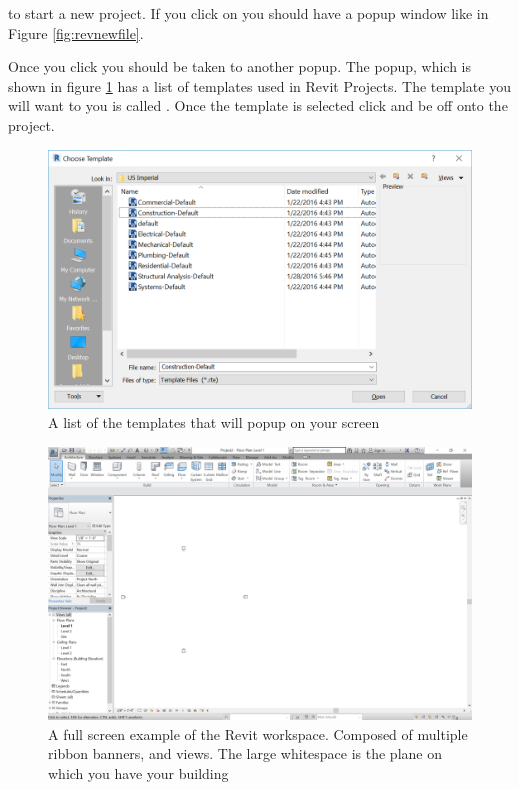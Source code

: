 \documentclass{tufte-book} %
\begin{document}
 to start a new project. If you click on  you should have a popup window like in Figure \ref{fig:revnewfile}. 

Once you click  you should be taken to another popup. The popup, which is shown in figure \ref{fig:revtmpview} has a list of templates used in Revit Projects. The template you will want to you is called . Once the template is selected click  and be off onto the project.


\begin{figure}
	\includegraphics[width=\linewidth]{revittemplateview.png}
	\caption[A template file list]{A list of the templates that will popup on your screen}
	\label{fig:revtmpview}
\end{figure}

\begin{figure}
	\includegraphics[width=\linewidth]{revitfullpageview.png}
	\caption[A revit default workspace]{A full screen example of the Revit workspace. Composed of multiple ribbon banners, and views. The large whitespace is the plane on which you  have your building}
	\label{fig:revfullview}
\end{figure}
\end{document}
